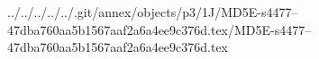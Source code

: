 ../../../../../.git/annex/objects/p3/1J/MD5E-s4477--47dba760aa5b1567aaf2a6a4ee9c376d.tex/MD5E-s4477--47dba760aa5b1567aaf2a6a4ee9c376d.tex